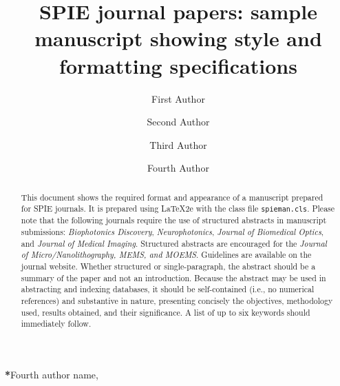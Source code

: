 \documentclass[12pt]{spieman}  %
\title{SPIE journal papers: sample manuscript showing style and formatting specifications}
\author[a]{First Author}
\author[a]{Second Author}
\author[b]{Third Author}
\author[a,b,*]{Fourth Author}
\affil[a]{University Name, Faculty Group, Department, Street Address, City, Country}
\affil[b]{Company Name, Street Address, City, Country}
\begin{document}
 
\maketitle

\begin{abstract}
This document shows the required format and appearance of a manuscript prepared for SPIE journals. It is prepared using LaTeX2e with the class file \texttt{spieman.cls}. Please note that the following journals require the use of structured abstracts in manuscript submissions: \textit{Biophotonics Discovery}, \textit{Neurophotonics},  \textit{Journal of Biomedical Optics}, and \textit{Journal of Medical Imaging}. Structured abstracts are encouraged for the \textit{Journal of Micro/Nanolithography, MEMS, and MOEMS}. Guidelines are available on the journal website. Whether structured or single-paragraph, the abstract should be a summary of the paper and not an introduction. Because the abstract may be used in abstracting and indexing databases, it should be self-contained (i.e., no numerical references) and substantive in nature, presenting concisely the objectives, methodology used, results obtained, and their significance. A list of up to six keywords should immediately follow. 
\end{abstract}


{\noindent \footnotesize\textbf{*}Fourth author name,   }
\end{document}
